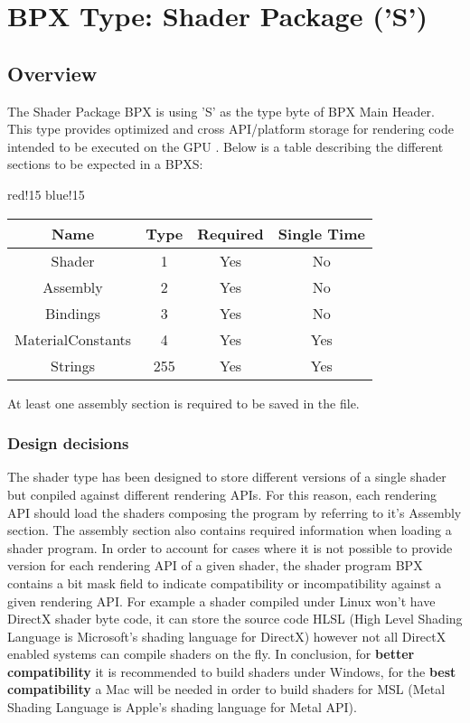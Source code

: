 \section{BPX Type: Shader Package ('S')}

\subsection{Overview}
The Shader Package BPX is using 'S' as the type byte of BPX Main Header. This type provides optimized and cross API/platform storage for rendering code intended to be executed on the GPU \cite{GPU}.
\newline
Below is a table describing the different sections to be expected in a BPXS:
\begin{center}
    {
        {red!15}
        {blue!15}
        \begin{tabular}{|c|c|c|c|}
            \hline
            \textbf{Name} & \textbf{Type} & \textbf{Required} & \textbf{Single Time} \\
    
            \hline\hline
            Shader & 1 & Yes & No \\
            Assembly & 2 & Yes & No \\
            Bindings & 3 & Yes & No \\
            MaterialConstants & 4 & Yes & Yes \\
            Strings & 255 & Yes & Yes \\
            \hline
        \end{tabular}
    }
\end{center}
At least one assembly section is required to be saved in the file.

\subsubsection{Design decisions}
The shader type has been designed to store different versions of a single shader but conpiled against different rendering APIs.\newline
For this reason, each rendering API should load the shaders composing the program by referring to it's Assembly section.\newline
The assembly section also contains required information when loading a shader program.\newline
In order to account for cases where it is not possible to provide version for each rendering API of a given shader, the shader program BPX contains a bit mask field to indicate compatibility or incompatibility against a given rendering API.\newline
For example a shader compiled under Linux won't have DirectX shader byte code, it can store the source code HLSL (High Level Shading Language is Microsoft's shading language for DirectX) however not all DirectX enabled systems can compile shaders on the fly.\newline
In conclusion, for \textbf{better compatibility} it is recommended to build shaders under Windows, for the \textbf{best compatibility} a Mac will be needed in order to build shaders for MSL (Metal Shading Language is Apple's shading language for Metal API).

